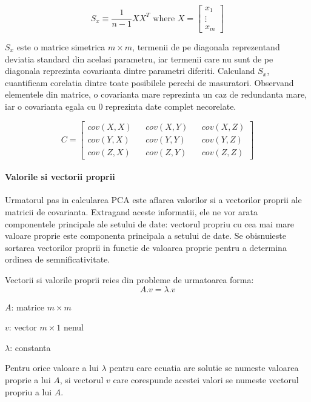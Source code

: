 \documentclass[12pt,oneside]{article}
\begin{document}
\begin{equation}
S_x \equiv \frac{1}{n-1}XX^T \text { where } X = 
\begin{bmatrix}
x_1 \\ \vdots \\ x_m
\end{bmatrix}
\end{equation}

$S_x$ este o matrice simetrica $m \times m$, termenii de pe diagonala reprezentand deviatia standard din acelasi parametru, iar termenii care nu sunt de pe diagonala reprezinta covarianta dintre parametri diferiti. Calculand $S_x$, cuantificam corelatia dintre toate posibilele perechi de masuratori. Observand elementele din matrice, o covarianta mare reprezinta un caz de redundanta mare, iar o covarianta egala cu 0 reprezinta date complet necorelate.

\begin{equation}
C=\begin{bmatrix}
cov(X,X) && cov(X,Y) && cov(X,Z) \\
cov(Y,X) && cov(Y,Y) && cov(Y,Z) \\
cov(Z,X) && cov(Z,Y) && cov(Z,Z)
\end{bmatrix}
\end{equation}


\paragraph{Valorile si vectorii proprii}
Urmatorul pas in calcularea PCA este aflarea valorilor si a vectorilor proprii ale matricii de covarianta. Extragand aceste informatii, ele ne vor arata componentele principale ale setului de date: vectorul propriu cu cea mai mare valoare proprie este componenta principala a setului de date. Se obisnuieste sortarea vectorilor proprii in functie de valoarea proprie pentru a determina ordinea de semnificativitate.

Vectorii si valorile proprii reies din probleme de urmatoarea forma:
\begin{equation}
A.v= \lambda . v
\end{equation}

\textbf{$A$}: matrice $m \times m$


\textbf{$v$}: vector $m \times 1$  nenul


$\lambda$: constanta

Pentru orice valoare a lui $\lambda$ pentru care ecuatia are solutie se numeste valoarea proprie a lui $A$, si vectorul $v$ care corespunde acestei valori se numeste vectorul propriu a lui $A$. 
\end{document}
